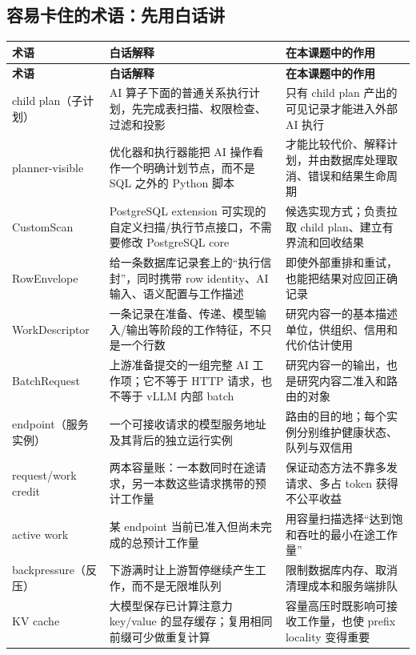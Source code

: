 \documentclass[10pt,a4paper]{ctexart}
\begin{document}
\subsection{容易卡住的术语：先用白话讲}
\begin{longtable}{>{\raggedright\arraybackslash}p{3.25cm}>{\raggedright\arraybackslash}p{6.1cm}>{\raggedright\arraybackslash}p{5.7cm}}
\toprule
\textbf{术语} & \textbf{白话解释} & \textbf{在本课题中的作用} \\
\midrule
\endfirsthead
\toprule
\textbf{术语} & \textbf{白话解释} & \textbf{在本课题中的作用} \\
\midrule
\endhead
child plan（子计划） & AI 算子下面的普通关系执行计划，先完成表扫描、权限检查、过滤和投影 & 只有 child plan 产出的可见记录才能进入外部 AI 执行 \\
planner-visible & 优化器和执行器能把 AI 操作看作一个明确计划节点，而不是 SQL 之外的 Python 脚本 & 才能比较代价、解释计划，并由数据库处理取消、错误和结果生命周期 \\
CustomScan & PostgreSQL extension 可实现的自定义扫描/执行节点接口，不需要修改 PostgreSQL core & 候选实现方式；负责拉取 child plan、建立有界流和回收结果 \\
RowEnvelope & 给一条数据库记录套上的“执行信封”，同时携带 row identity、AI 输入、语义配置与工作描述 & 即使外部重排和重试，也能把结果对应回正确记录 \\
WorkDescriptor & 一条记录在准备、传递、模型输入/输出等阶段的工作特征，不只是一个行数 & 研究内容一的基本描述单位，供组织、信用和代价估计使用 \\
BatchRequest & 上游准备提交的一组完整 AI 工作项；它不等于 HTTP 请求，也不等于 vLLM 内部 batch & 研究内容一的输出，也是研究内容二准入和路由的对象 \\
endpoint（服务实例） & 一个可接收请求的模型服务地址及其背后的独立运行实例 & 路由的目的地；每个实例分别维护健康状态、队列与双信用 \\
request/work credit & 两本容量账：一本数同时在途请求，另一本数这些请求携带的预计工作量 & 保证动态方法不靠多发请求、多占 token 获得不公平收益 \\
active work & 某 endpoint 当前已准入但尚未完成的总预计工作量 & 用容量扫描选择“达到饱和吞吐的最小在途工作量” \\
backpressure（反压） & 下游满时让上游暂停继续产生工作，而不是无限堆队列 & 限制数据库内存、取消清理成本和服务端排队 \\
KV cache & 大模型保存已计算注意力 key/value 的显存缓存；复用相同前缀可少做重复计算 & 容量高压时既影响可接收工作量，也使 prefix locality 变得重要 \\

\end{longtable}
\end{document}

